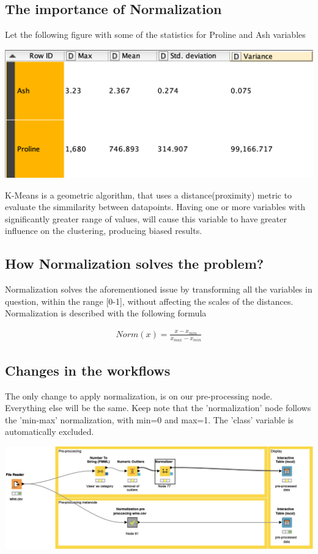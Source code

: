 \documentclass[11pt]{article}
\begin{document}
		\subsection*{The importance of Normalization}
			Let the following figure with some of the statistics for Proline and Ash variables
			\iftrue
			\begin{center}
				\includegraphics[scale=0.25]{res/t2/t21/t21-no-norm}
			\end{center}
			\fi
			K-Means is a geometric algorithm, that uses a distance(proximity) metric to evaluate the simmilarity between datapoints. Having one or more variables with significantly greater range of values, will cause this variable to have greater influence on the clustering, producing biased results.
		\subsection*{How Normalization solves the problem?}
			Normalization solves the aforementioned issue by transforming all the variables in question, within the range [0-1], without affecting the scales of the distances. Normalization is described with the following formula
			\iftrue
			\begin{align}
				Norm(x) = \frac{x-x_{min}}{x_{max}-x_{min}}
			\end{align}
			\fi
		\subsection*{Changes in the workflows}
			The only change to apply normalization, is on our pre-processing node. Everything else will be the same. Keep note that the 'normalization' node follows the 'min-max' normalization, with min=0 and max=1. The 'class' variable is automatically excluded.
			\iftrue
			\begin{center}
				\includegraphics[scale=0.35]{res/t2/t23/t23-workflow}
			\end{center}
			\fi
\end{document}
